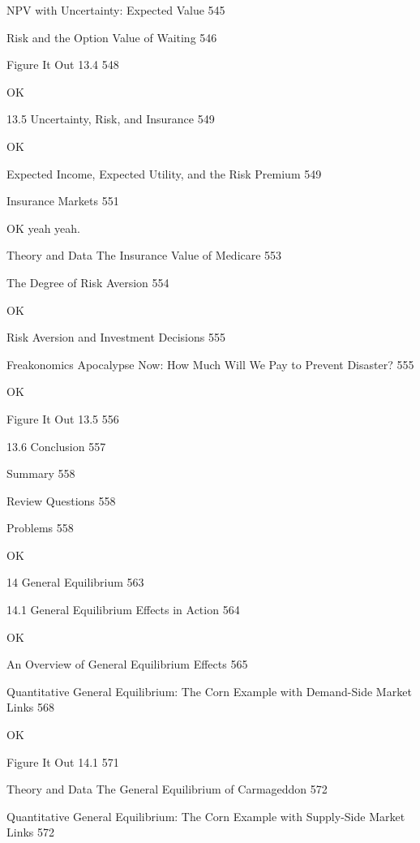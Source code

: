 NPV with Uncertainty: Expected Value 545



Risk and the Option Value of Waiting 546



Figure It Out 13.4 548

OK

13.5 Uncertainty, Risk, and Insurance 549

OK

Expected Income, Expected Utility, and the Risk Premium 549



Insurance Markets 551

OK yeah yeah.

Theory and Data The Insurance Value of Medicare 553



The Degree of Risk Aversion 554

OK

Risk Aversion and Investment Decisions 555



Freakonomics Apocalypse Now: How Much Will We Pay to Prevent Disaster? 555

OK

Figure It Out 13.5 556



13.6 Conclusion 557



Summary 558



Review Questions 558



Problems 558

OK

14 General Equilibrium 563



14.1 General Equilibrium Effects in Action 564

OK

An Overview of General Equilibrium Effects 565



Quantitative General Equilibrium: The Corn Example with Demand-Side Market Links 568

OK

Figure It Out 14.1 571



Theory and Data The General Equilibrium of Carmageddon 572



Quantitative General Equilibrium: The Corn Example with Supply-Side Market Links 572

